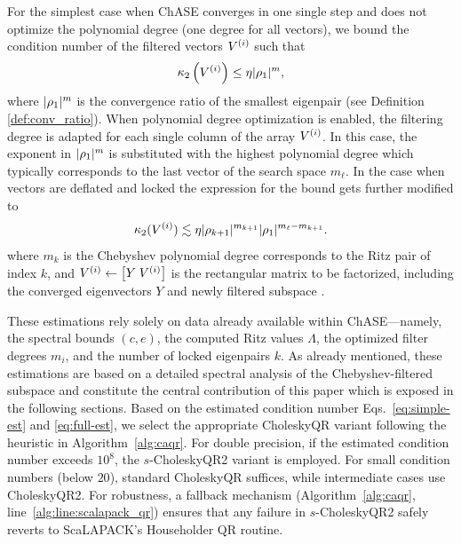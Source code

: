 For the simplest case when ChASE converges in one single step and does not optimize the polynomial degree (one degree for all vectors), we bound the condition number of the filtered vectors $V^{(i)}$ such that
\begin{equation}
\label{eq:simple-est}
\mathop\mathrm{\kappa}_2\nolimits \left(V^{(i)} \right) \leq \eta |\rho_{1}|^{m},
\end{equation}
where $|\rho_{1}|^{m}$ is the convergence ratio of the smallest eigenpair (see Definition \ref{def:conv_ratio}). When polynomial degree optimization is enabled, the filtering degree is adapted for each single column of the array $V^{(i)}$. In this case, the exponent in $|\rho_{1}|^{m}$ is substituted with the highest polynomial degree which typically corresponds to the last vector of the search space $m_\ell$. 
In the case when vectors are deflated and locked the expression for the bound gets further modified to
\begin{equation}
\label{eq:full-est}
\mathop\mathrm{\kappa}_2\nolimits (V^{(i)}) \lesssim \eta |\rho_{k+1}|^{m_{k+1}} |\rho_{1}|^{m_\ell-m_{k+1}}. 
\end{equation}
where $m_k$ is the Chebyshev polynomial degree corresponds to the Ritz pair of index $k$, and $V^{(i)} \gets \big[Y\; V^{(i)}\big]$ is the rectangular matrix to be factorized, including the converged eigenvectors $Y$
and newly filtered subspace .

These estimations rely solely on data already available within ChASE---namely, the spectral bounds $(c, e)$, the computed Ritz values $\Lambda$, the optimized filter degrees $m_i$, and the number of locked eigenpairs $k$. 
As already mentioned, these estimations are based on a detailed spectral analysis of the Chebyshev-filtered subspace and constitute the central contribution of this paper which is exposed in the following sections.
Based on the estimated condition number Eqs.~\eqref{eq:simple-est} and \eqref{eq:full-est}, we select the appropriate CholeskyQR variant following the heuristic in Algorithm~\ref{alg:caqr}. For double precision, if the estimated condition number exceeds $10^8$, the $s$-CholeskyQR2 variant is employed. For small condition numbers (below $20$), standard CholeskyQR suffices, while intermediate cases use CholeskyQR2. For robustness, a fallback mechanism (Algorithm~\ref{alg:caqr}, line~\ref{alg:line:scalapack_qr}) ensures that any failure in $s$-CholeskyQR2$ $ safely reverts to ScaLAPACK’s Householder QR routine.

